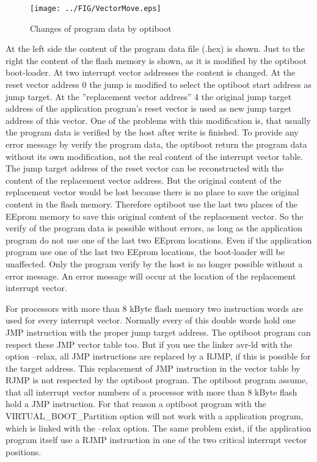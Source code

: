 \begin{figure}[H]
\centering
\texttt{[image: ../FIG/VectorMove.eps]}
\caption{Changes of program data by optiboot}
\label{fig:VectorMove}
\end{figure}

At the left side the content of the program data file (.hex) is shown.
Just to the right the content of the flash memory is shown, as it is modified by the
optiboot boot-loader. At two interrupt vector addresses the content is changed.
At the reset vector address 0 the jump is modified to select the optiboot start address 
as jump target.
At the ''replacement vector address'' 4 the original jump target address of the application
program's reset vector is used as new jump target address of this vector.
One of the problems with this modification is, that usually the program data
is verified by the host after write is finished.
To provide any error message by verify the program data, the optiboot return the
program data without its own modification, not the real content of the interrupt vector table.
The jump target address of the reset vector can be reconstructed with the content
of the replacement vector address.
But the original content of the replacement vector would be lost because there is no
place to save the original content in the flash memory.
Therefore optiboot use the last two places of the EEprom memory to save this original
content of the replacement vector. 
So the verify of the program data is possible without errors, as long as the application
program do not use one of the last two EEprom locations.
Even if the application program use one of the last two EEprom locations,
the boot-loader will be unaffected. Only the program verify by the host is
no longer possible without a error message.
An error message will occur at the location of the replacement interrupt vector.

For processors with more than 8 kByte flash memory two instruction words are used for every
interrupt vector. Normally every of this double words hold one JMP instruction with the
proper jump target address. The optiboot program can respect these JMP vector table too.
But if you use the linker avr-ld with the option --relax, all JMP instructions are replaced
by a RJMP, if this is possible for the target address.
This replacement of JMP instruction in the vector table by RJMP is not respected
by the optiboot program.
The optiboot program assume, that all interrupt vector numbers of a processor with
more than 8 kByte flash hold a JMP instruction.
For that reason a optiboot program with the VIRTUAL\_BOOT\_Partition option will not
work with a application program, which is linked with the --relax option.
The same problem exist, if the application program itself use a RJMP instruction in
one of the two critical interrupt vector positions.

